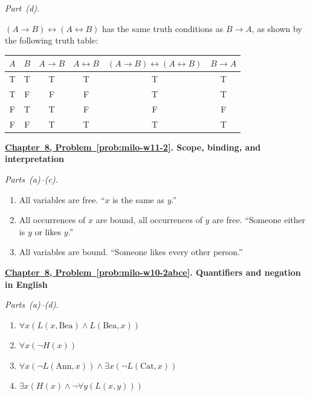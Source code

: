 \documentclass[11pt,letterpaper,oneside,openany]{book}
\newcounter{problem}[chapter]
\newcommand{\problemref}[2]{\hyperref[prob:#2]{Chapter~#1, Problem~\ref*{prob:#2}}}
\newcommand{\solutionheading}[3]{\par\addvspace{12pt}\Needspace{4\baselineskip}\textbf{\problemref{#1}{#2}. #3}\par\nobreak}
\begin{document}
\par\medskip\noindent\textit{Part~(d).}\par\nobreak
$(A \to B) \leftrightarrow (A \leftrightarrow B)$ has the same truth conditions as $B \to A$, as shown by the following truth table: \\
\begin{center}
\begin{tabular}{c|c||c|c|c|c}
    $A$ & $B$ & $A \to B$ & $A \leftrightarrow B$ & $(A \to B) \leftrightarrow (A \leftrightarrow B)$ & $B \to A$ \\ \hline
    T & T & T & T & T & T \\ \hline
    T & F & F & F & T& T \\ \hline
    F & T & T & F & F& F \\ \hline
    F & F & T & T & T & T \\ \hline
\end{tabular}
\end{center}

\solutionheading{8}{milo-w11-2}{Scope, binding, and interpretation}
\par\medskip\noindent\textit{Parts~(a)--(c).}\par\nobreak
\begin{enumerate}[label=(\alph*)]
    \item All variables are free. ``$x$ is the same as $y$.'' 
    \item All occurrences of $x$ are bound, all occurrences of $y$ are free. ``Someone either is $y$ or likes $y$.''
    \item All variables are bound. ``Someone likes every other person.'' \end{enumerate}

\solutionheading{8}{milo-w10-2abce}{Quantifiers and negation in English}
\par\medskip\noindent\textit{Parts~(a)--(d).}\par\nobreak
\begin{enumerate}[label=(\alph*)]
\item $\forall x (L(x,\text{Bea}) \land L(\text{Bea},x))$
\item $\forall x(\neg H(x))$
\item $\forall x(\neg L(\text{Ann}, x)) \land \exists x(\neg L(\text{Cat},x))$
\item $\exists x (H(x) \land \neg \forall y(L(x,y)))$
\end{enumerate}
\end{document}
